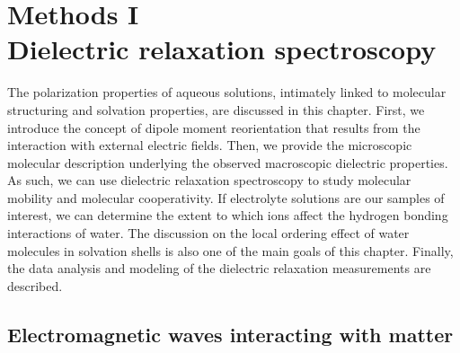 


\chapter[Methods I: Dielectric relaxation spectroscopy]{Methods I\\Dielectric relaxation spectroscopy}
\label{chap:methods1}
\label{MethodsChapter2}
\label{ChapterDRS}

\vspace{30pt}


The polarization properties of aqueous solutions, intimately linked to molecular structuring and solvation properties, are discussed in this chapter. First, we introduce the concept of dipole moment reorientation that results from the interaction with external electric fields. Then, we provide the microscopic molecular description underlying the observed macroscopic dielectric properties. As such, we can use dielectric relaxation spectroscopy to study molecular mobility and molecular cooperativity. If electrolyte solutions are our samples of interest, we can determine the extent to which ions affect the hydrogen bonding interactions of water. The discussion on the local ordering effect of water molecules in solvation shells is also one of the main goals of this chapter. Finally, the data analysis and modeling of the dielectric relaxation measurements are described.



\newpage



\section{Electromagnetic waves interacting with matter}\label{MolVibs}

